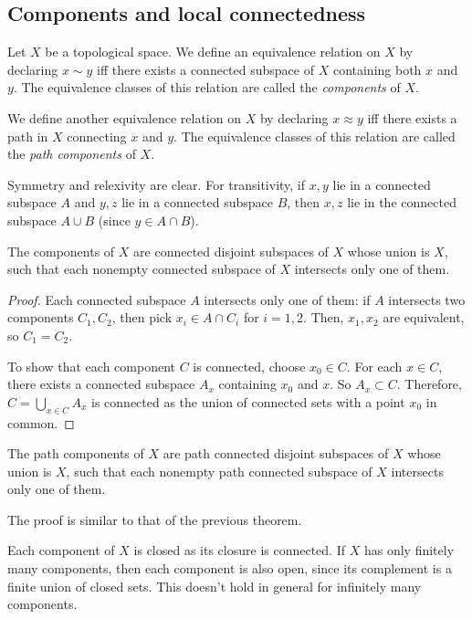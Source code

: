 \subsection{Components and local connectedness}

\begin{definition}
    Let $X$ be a topological space. We define an equivalence relation on $X$ by declaring $x\sim y$ iff there exists a connected subspace of $X$ containing both $x$ and $y$. The equivalence classes of this relation are called the \emph{components} of $X$.

    We define another equivalence relation on $X$ by declaring $x\approx y$ iff there exists a path in $X$ connecting $x$ and $y$. The equivalence classes of this relation are called the \emph{path components} of $X$.
\end{definition}

Symmetry and relexivity are clear. For transitivity, if $x,y$ lie in a connected subspace $A$ and $y,z$ lie in a connected subspace $B$, then $x,z$ lie in the connected subspace $A\cup B$ (since $y\in A\cap B$). 



\begin{theorem}
    The components of $X$ are connected disjoint subspaces of $X$ whose union is $X$, such that each nonempty connected subspace of $X$ intersects only one of them.
\end{theorem}

\begin{proof}
    Each connected subspace $A$ intersects only one of them: if $A$ intersects two components $C_1,C_2$, then pick $x_i\in A\cap C_i$ for $i=1,2$. Then, $x_1,x_2$ are equivalent, so $C_1=C_2$.

    To show that each component $C$ is connected, choose $x_0\in C$. For each $x\in C$, there exists a connected subspace $A_x$ containing $x_0$ and $x$. So $A_x\subset C$. Therefore, $C=\bigcup_{x\in C}A_x$ is connected as the union of connected sets with a point $x_0$ in common.
\end{proof}

\begin{theorem}
    The path components of $X$ are path connected disjoint subspaces of $X$ whose union is $X$, such that each nonempty path connected subspace of $X$ intersects only one of them.
\end{theorem}
The proof is similar to that of the previous theorem.

\begin{remark}
    Each component of $X$ is closed as its closure is connected. If $X$ has only finitely many components, then each component is also open, since its complement is a finite union of closed sets. This doesn't hold in general for infinitely many components.
\end{remark}

